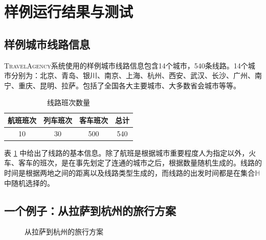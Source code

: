 \section{样例运行结果与测试}
\label{sec:experiments}

\subsection{样例城市线路信息}

\textsc{TravelAgency}系统使用的样例城市线路信息包含14个城市，540条线路。14个城市分别为：北京、青岛、银川、南京、上海、杭州、西安、武汉、长沙、广州、南宁、重庆、昆明、拉萨。包括了全国各大主要城市、大多数省会城市等等。

\begin{table}[h]
\centering
\begin{tabular}{cccc}
\toprule
航班班次 & 列车班次 & 客车班次 & 总计 \\
\midrule
10 & 30 & 500 & 540 \\
\bottomrule
\end{tabular}
\caption{线路班次数量}
\label{tab:line-info}
\end{table}

表 \ref{tab:line-info} 中给出了线路的基本信息。除了航班是根据城市重要程度人为指定以外，火车、客车的班次，是在事先划定了连通的城市之后，根据数量随机生成的。线路的时间是根据两地之间的距离以及线路类型生成的，而线路的出发时间都是在集合$\mathds H$中随机选择的。

\subsection{一个例子：从拉萨到杭州的旅行方案}

\begin{figure}[t]
	\centering
	\caption{从拉萨到杭州的旅行方案}
	\label{fig:example-journey}
\end{figure}

